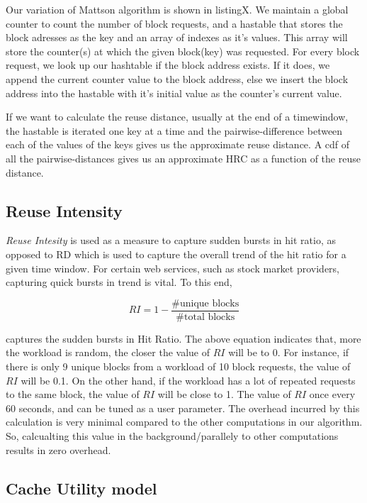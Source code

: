  Our variation of Mattson algorithm is shown in listingX. We maintain a global counter to count the number of block requests, and a hastable that stores the block adresses as the key and an array of indexes as it's values. This array will store the counter(s) at which the given block(key) was requested. For every block request, we look up our hashtable if the block address exists. If it does, we append the current counter value to the block address, else we insert the block address into the hastable with it's initial value as the counter's current value.

 If we want to calculate the reuse distance, usually at the end of a timewindow, the hastable is iterated one key at a time and the pairwise-difference between each of the values of the keys gives us the approximate reuse distance. A cdf of all the pairwise-distances gives us an approximate HRC as a function of the reuse distance. 

 \subsection{Reuse Intensity}

\emph{Reuse Intesity} is used as a measure to capture sudden bursts in hit ratio, as opposed to RD which is used to capture the overall trend of the hit ratio for a given time window. For certain web services, such as stock market providers, capturing quick bursts in trend is vital. To this end, 

\begin{equation}
RI = 1 - \frac{\text{\# unique blocks}}{\text{\# total blocks}}
\label{eq:ri}
\end{equation}

captures the sudden bursts in Hit Ratio. The above equation indicates that, more the workload is random, the closer the value of $RI$ will be to 0. For instance, if there is only 9 unique blocks from a workload of 10 block requests, the value of $RI$ will be 0.1. On the other hand, if the workload has a lot of repeated requests to the same block, the value of $RI$ will be close to 1. The value of $RI$ once every 60 seconds, and can be tuned as a user parameter. The overhead incurred by this calculation is very minimal compared to the other computations in our algorithm. So, calcualting this value in the background/parallely to other computations results in zero overhead. 

\subsection{Cache Utility model}


